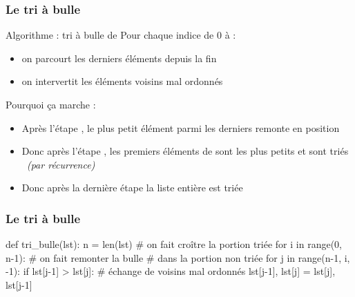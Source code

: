 \documentclass[12pt]{linfo-beamer}
\begin{document}
\begin{frame}
\frametitle{Le tri à bulle}
  \begin{beamerboxesrounded}{Algorithme : tri à bulle de }
  Pour chaque indice  de 0 à  :
    \begin{itemize}
      \item on parcourt les  derniers éléments depuis la fin
      \item on intervertit les éléments voisins mal ordonnés
    \end{itemize}
  \end{beamerboxesrounded}

    \vfill

  Pourquoi ça marche :
  \begin{itemize}
  \item Après l'étape , le plus petit élément parmi les
     derniers remonte en position 
  \item Donc après l'étape , les  premiers
    éléments de  sont les plus petits et sont triés
    \emph{\small \color{gray} (par récurrence)}
  \item Donc après la dernière étape la liste entière est triée
  \end{itemize}

\end{frame}


\begin{frame}[fragile]
 \frametitle{Le tri à bulle}

\small

\begin{pyframe}{}
def tri_bulle(lst):
    n = len(lst)
    # on fait croître la portion triée
    for i in range(0, n-1):
        # on fait remonter la bulle
        # dans la portion non triée
        for j in range(n-1, i, -1):
            if lst[j-1] > lst[j]:
                # échange de voisins mal ordonnés
                lst[j-1], lst[j] = lst[j], lst[j-1]
\end{pyframe}


\end{frame}
\end{document}

